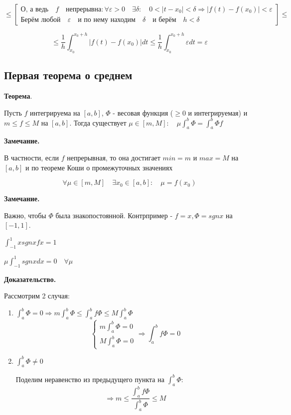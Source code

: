 \documentclass[a4paper]{article}
\begin{document}
\begin{definit}
\begin{hproof}
\[
 \leq \begin{bmatrix}
 \text{О, а ведь} \quad f \quad \text{непрерывна}: \forall \varepsilon > 0 \quad \exists \delta: \quad 0 < |t-x_0| < \delta \Rightarrow |f(t)-f(x_0)| < \varepsilon \\
 \text{Берём любой} \quad \varepsilon \quad \text{и по нему находим} \quad \delta \quad \text{и берём} \quad h < \delta 
 \end{bmatrix} \leq 
\]

\[
\leq \frac{1}{h} \int_{x_0}^{x_0+h} |f(t) - f(x_0)| dt \leq \frac{1}{h} \int_{x_0}^{x_0+h} \varepsilon dt = \varepsilon
\]
\end{hproof}
\end{definit}

\begin{definit}
\subsection*{Первая теорема о среднем}

\begin{htheorem}\textbf{Теорема}.

Пусть $f$ интегрируема на $[a,b]$, $\Phi$ - весовая функция ($\geq 0$ и интегрируемая) \newline и $m \leq f \leq M$ на $[a,b]$. Тогда существует $\mu \in [m, M]: \quad \mu \int_a^b \Phi = \int_a^b \Phi f$

\textbf{Замечание.}

В частности, если $f$ непрерывная, то она достигает $min = m$ и $max = M$ на $[a,b]$ и по теореме Коши о промежуточных значениях

\[
\forall \mu \in [m,M] \quad \exists x_0 \in [a,b]: \quad \mu = f(x_0)
\]

\textbf{Замечание.}

Важно, чтобы $\Phi$ была знакопостоянной. Контрпример - $f = x, \Phi = sgn x$ на $[-1,1]$.

$\int_{-1}^1 x sgn x fx = 1$

$\mu \int_{-1}^1 sgn x dx = 0 \quad \forall \mu$
\end{htheorem}

\begin{hproof}\textbf{Доказательство.}

Рассмотрим 2 случая:
\begin{enumerate}
\item $\int_a^b \Phi = 0 \Rightarrow  m \int_a^b \Phi \leq \int_a^b f \Phi \leq M \int_a^b \Phi$
\[
\begin{cases}
m \int_a^b \Phi = 0 \\ M \int_a^b \Phi = 0
\end{cases} \Rightarrow \int_a^b f \Phi = 0
\]

\item $\int_a^b \Phi \neq 0$

Поделим неравенство из предыдущего пункта на $\int_a^b \Phi$:
\[
\Rightarrow  m \leq \frac{\int_a^b f \Phi}{\int_a^b \Phi} \leq M
\]


\end{enumerate}
\end{hproof}

\end{definit}
\end{document}
